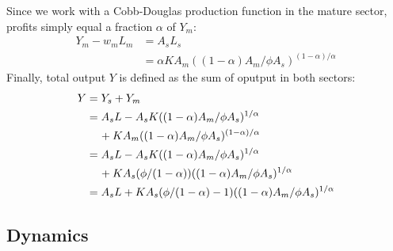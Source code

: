 \documentclass[a4paper]{article}
\begin{document}
Since we work with a Cobb-Douglas production function in the mature sector, profits simply equal a fraction ${\alpha}$ of $Y_m$:
\begin{align}
 Y_m-w_mL_m &= A_sL_s \nonumber\\
 &={\alpha}KA_m((1-{\alpha})A_m/{\phi}A_s)^{(1-\alpha)/\alpha}
\end{align}
Finally, total output $Y$ is defined as the sum of oputput in both sectors:
\begin{align}
 Y &= Y_s+Y_m \nonumber\\
 &= A_sL-A_sK((1-{\alpha})A_m/{\phi}A_s)^{1/{\alpha}}\nonumber\\ 
 &\hspace{0.4cm}+KA_m((1-{\alpha})A_m/{\phi}A_s)^{(1-\alpha)/\alpha} \nonumber\\
 &= A_sL-A_sK((1-{\alpha})A_m/{\phi}A_s)^{1/{\alpha}}\nonumber\\
 &\hspace{0.4cm}+KA_s({\phi/(1-\alpha)})((1-{\alpha})A_m/{\phi}A_s)^{1/\alpha} \nonumber\\
 &= A_sL+KA_s({\phi/(1-\alpha)-1})((1-{\alpha})A_m/{\phi}A_s)^{1/\alpha}
\end{align}

\subsection{Dynamics}
\end{document}
